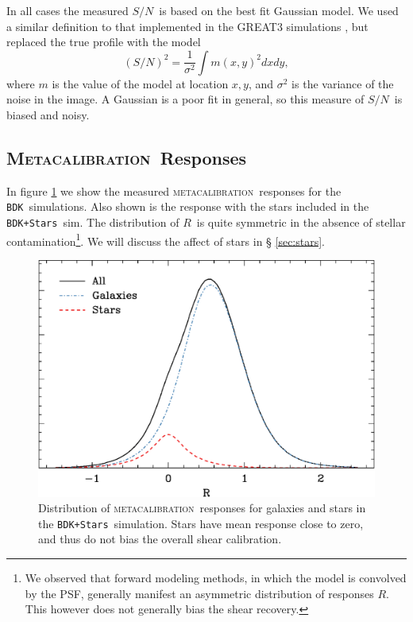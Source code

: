 \documentclass[iop]{emulateapj}
\newcommand{\snr}{$S/N$}
\newcommand{\mcal}{\textsc{metacalibration}}
\newcommand{\Mcal}{\textsc{Metacalibration}}
\newcommand{\mcalR}{\mbox{\boldmath $R$}}
\newcommand{\bdksim}{\texttt{BDK}}
\newcommand{\bdstar}{\texttt{BDK+Stars}}
\begin{document}
In all cases the measured \snr\ is based on the best fit Gaussian model. 
We used a similar definition to that implemented in the GREAT3 simulations \citep[][equation
16]{great3}, but replaced the true profile with the model
\begin{equation}
    (S/N)^2 = \frac{1}{\sigma^2} \int m(x,y)^2 dx dy,
\end{equation}
where $m$ is the value of the model at location $x,y$, and $\sigma^2$ is the
variance of the noise in the image. A Gaussian is a poor fit in general, so
this measure of \snr\ is biased and noisy.

\subsection{\Mcal\ Responses}

In figure \ref{fig:Rstars} we show the measured \mcal\ responses for the
\bdksim\  simulations.  Also shown is the response with the stars included in
the \bdstar\ sim.  The distribution of \mcalR\ is quite symmetric in the
absence of stellar contamination\footnote{We observed that forward modeling
methods, in which the model is convolved by the PSF, generally manifest
an asymmetric distribution of responses \mcalR. This however does not
generally bias the shear recovery.}.  We will discuss the affect of stars in \S
\ref{sec:stars}.

\begin{figure}[h]
    \centering
    \includegraphics[width=\columnwidth]{R-bdj03-bdj03stars.eps}

    \caption{Distribution of \mcal\ responses for galaxies and stars in
    the \bdstar\ simulation.  Stars have mean response close to zero,
    and thus do not bias the overall shear calibration.}

\label{fig:Rstars}
\end{figure}
\end{document}
